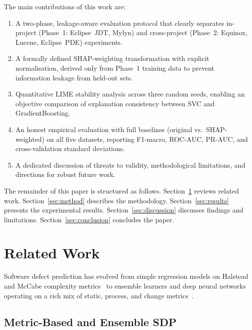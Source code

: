 \documentclass[12pt, a4paper]{article}
\newcommand{\model}[1]{\textsf{#1}}
\begin{document}
The main contributions of this work are:
\begin{enumerate}[leftmargin=*, label=(\arabic*), itemsep=2pt]
  \item A two-phase, leakage-aware evaluation protocol that clearly separates
        in-project (Phase~1: Eclipse~JDT, Mylyn) and cross-project (Phase~2:
        Equinox, Lucene, Eclipse~PDE) experiments.

  \item A formally defined SHAP-weighting transformation with explicit
        normalisation, derived only from Phase~1 training data to prevent
        information leakage from held-out sets.

  \item Quantitative LIME stability analysis across three random seeds,
        enabling an objective comparison of explanation consistency between
        \model{SVC} and \model{GradientBoosting}.

  \item An honest empirical evaluation with full baselines (original
        vs.\ SHAP-weighted) on all five datasets, reporting F1-macro,
        ROC-AUC, PR-AUC, and cross-validation standard deviations.

  \item A dedicated discussion of threats to validity, methodological
        limitations, and directions for robust future work.
\end{enumerate}

The remainder of this paper is structured as follows.
Section~\ref{sec:rw} reviews related work.
Section~\ref{sec:method} describes the methodology.
Section~\ref{sec:results} presents the experimental results.
Section~\ref{sec:discussion} discusses findings and limitations.
Section~\ref{sec:conclusion} concludes the paper.

\section{Related Work}
\label{sec:rw}

Software defect prediction has evolved from simple regression models on
Halstead and McCabe complexity metrics~\cite{ostrand2005} to ensemble
learners and deep neural networks operating on a rich mix of static, process,
and change metrics~\cite{hall2012,li2025,wang2024}.

\subsection{Metric-Based and Ensemble SDP}
\end{document}
